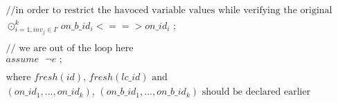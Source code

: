 \documentclass[a4paper,12pt]{article}
\begin{document}
\begin{equation*}
\begin{multlined}
		\text{//in order to restrict the havoced variable
			 values while verifying the original loop} \\
		\odot^k_{i=1, inv_j \in I'}
		on\_b\_id_i <==> on\_id_i \text{ ;} \\
		\\
		\text{// we are out of the loop here} \\
		assume \text{ } \lnot e \text{ ;} \\
		\\
		\text{where $fresh(id)$, $fresh(lc\_id)$ and} \\ \text{$(on\_id_1,...,on\_id_k)$,
			$(on\_b\_id_1,...,on\_b\_id_k)$ 
			should be declared earlier} \\
	\end{multlined}
	\end{equation*}
	
\end{document}
